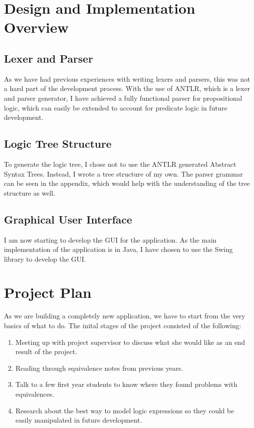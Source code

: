 \documentclass[12pt]{article}
\begin{document}
\newpage

\section{Design and Implementation Overview}
\subsection{Lexer and Parser}
As we have had previous experiences with writing lexers and parsers, this was not
a hard part of the development process. With the use of ANTLR, which is a lexer
and parser generator, I have achieved a fully functional parser for propositional
logic, which can easily be extended to account for predicate logic in future
development.

\subsection{Logic Tree Structure}
To generate the logic tree, I chose not to use the ANTLR generated Abstract Syntax
Trees. Instead, I wrote a tree structure of my own. The parser grammar can be seen
in the appendix, which would help with the understanding of the tree structure as well.

\subsection{Graphical User Interface}
I am now starting to develop the GUI for the application. As the main implementation
of the application is in Java, I have chosen to use the Swing library to develop
the GUI.

\newpage

\section{Project Plan}
As we are building a completely new application, we have to start from the
very basics of what to do. The inital stages of the project consisted of the
following:
\begin{enumerate}
	\item Meeting up with project supervisor to discuss what she would like as
				 an end result of the project.
	\item Reading through equivalence notes from previous years.
	\item Talk to a few first year students to know where they found problems
				 with equivalences.
	\item Research about the best way to model logic expressions so they could
   			 be easily manipulated in future development.
\end{enumerate}
\end{document}
